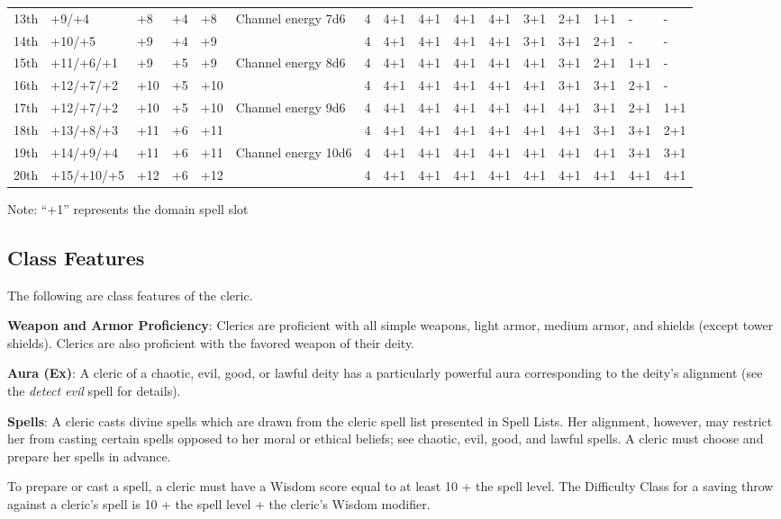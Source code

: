 \begin{table*}[]
\begin{tabularx}{\linewidth}{lp{6em}p{2.5em}p{2.5em}p{2.5em}Xllllllllll}
13th & +9/+4 & +8 & +4 & +8 & Channel energy 7d6 & 4 & 4+1 & 4+1 & 4+1 & 4+1 & 3+1 & 2+1 & 1+1 & - & -\\
14th & +10/+5 & +9 & +4 & +9 &  & 4 & 4+1 & 4+1 & 4+1 & 4+1 & 3+1 & 3+1 & 2+1 & - & -\\
15th & +11/+6/+1 & +9 & +5 & +9 & Channel energy 8d6 & 4 & 4+1 & 4+1 & 4+1 & 4+1 & 4+1 & 3+1 & 2+1 & 1+1 & -\\
16th & +12/+7/+2 & +10 & +5 & +10 &  & 4 & 4+1 & 4+1 & 4+1 & 4+1 & 4+1 & 3+1 & 3+1 & 2+1 & -\\
17th & +12/+7/+2 & +10 & +5 & +10 & Channel energy 9d6 & 4 & 4+1 & 4+1 & 4+1 & 4+1 & 4+1 & 4+1 & 3+1 & 2+1 & 1+1\\
18th & +13/+8/+3 & +11 & +6 & +11 &  & 4 & 4+1 & 4+1 & 4+1 & 4+1 & 4+1 & 4+1 & 3+1 & 3+1 & 2+1\\
19th & +14/+9/+4 & +11 & +6 & +11 & Channel energy 10d6 & 4 & 4+1 & 4+1 & 4+1 & 4+1 & 4+1 & 4+1 & 4+1 & 3+1 & 3+1\\
20th & +15/+10/+5 & +12 & +6 & +12 &  & 4 & 4+1 & 4+1 & 4+1 & 4+1 & 4+1 & 4+1 & 4+1 & 4+1 & 4+1\\
\end{tabularx}
 Note: ``+1'' represents the domain spell slot\\
\end{table*}

				
\subsection{Class Features}

				
The following are class features of the cleric.
				
\textbf{Weapon and Armor Proficiency}: Clerics are proficient with all simple weapons, light armor, medium armor, and shields (except tower shields). Clerics are also proficient with the favored weapon of their deity.
				
\textbf{Aura (Ex)}: A cleric of a chaotic, evil, good, or lawful deity has a particularly powerful aura corresponding to the deity's alignment (see the \textit{detect evil} spell for details).
				
\textbf{Spells}: A cleric casts divine spells which are drawn from the cleric spell list presented in Spell Lists. Her alignment, however, may restrict her from casting certain spells opposed to her moral or ethical beliefs; see chaotic, evil, good, and lawful spells. A cleric must choose and prepare her spells in advance.
				
To prepare or cast a spell, a cleric must have a Wisdom score equal to at least 10 + the spell level. The Difficulty Class for a saving throw against a cleric's spell is 10 + the spell level + the cleric's Wisdom modifier.
				
